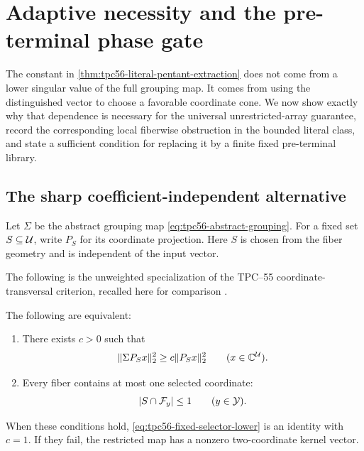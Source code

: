 \section{Adaptive necessity and the pre-terminal phase gate}
\label{sec:adaptive-boundary}

The constant in \cref{thm:tpc56-literal-pentant-extraction} does not come
from a lower singular value of the full grouping map.  It comes from using
the distinguished vector to choose a favorable coordinate cone.  We now
show exactly why that dependence is necessary for the universal
unrestricted-array guarantee, record the corresponding local fiberwise
obstruction in the bounded literal class, and state a sufficient condition
for replacing it by a finite fixed pre-terminal library.

\subsection{The sharp coefficient-independent alternative}

Let \(\Sigma\) be the abstract grouping map
\eqref{eq:tpc56-abstract-grouping}.  For a fixed set \(S\subseteq\mathcal U\),
write \(P_S\) for its coordinate projection.  Here \(S\) is chosen from
the fiber geometry and is independent of the input vector.

The following is the unweighted specialization of the TPC--55
coordinate-transversal criterion, recalled here for comparison
\citep{WangTPC55}.

\begin{theorem}
\label{thm:tpc56-fixed-selector-dichotomy}
The following are equivalent:
\begin{enumerate}[label=\textup{(\roman*)},leftmargin=2.8em]
 \item There exists \(c>0\) such that
 \begin{equation}
  \|\Sigma P_Sx\|_2^2\ge c\|P_Sx\|_2^2
  \qquad(x\in\mathbb C^{\mathcal U}).
  \label{eq:tpc56-fixed-selector-lower}
 \end{equation}
 \item Every fiber contains at most one selected coordinate:
 \begin{equation}
  |S\cap\mathcal F_y|\le1\qquad(y\in\mathcal Y).
  \label{eq:tpc56-fixed-selector-transversal}
 \end{equation}
\end{enumerate}
When these conditions hold, \eqref{eq:tpc56-fixed-selector-lower} is an
identity with \(c=1\).  If they fail, the restricted map has a nonzero
two-coordinate kernel vector.
\end{theorem}


